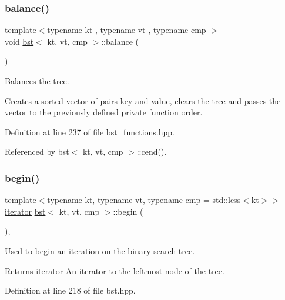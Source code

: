 \subsubsection{\texorpdfstring{balance()}{balance()}}
{\footnotesize\ttfamily template$<$typename kt , typename vt , typename cmp $>$ \\
void \hyperlink{classbst}{bst}$<$ kt, vt, cmp $>$\+::balance (\begin{DoxyParamCaption}{ }\end{DoxyParamCaption})\hspace{0.3cm}{\ttfamily [noexcept]}}



Balances the tree. 

Creates a sorted vector of pairs key and value, clears the tree and passes the vector to the previously defined private function order. 

Definition at line 237 of file bst\+\_\+functions.\+hpp.



Referenced by bst$<$ kt, vt, cmp $>$\+::cend().

\mbox{\label{classbst_a74c68495fd963c501084d129d4c0f5b1}} 
\subsubsection{\texorpdfstring{begin()}{begin()}\hspace{0.1cm}{\footnotesize\ttfamily [1/2]}}
{\footnotesize\ttfamily template$<$typename kt, typename vt, typename cmp = std\+::less$<$kt$>$$>$ \\
\hyperlink{classbst_a429b0445783ff6486882db5dee900ce0}{iterator} \hyperlink{classbst}{bst}$<$ kt, vt, cmp $>$\+::begin (\begin{DoxyParamCaption}{ }\end{DoxyParamCaption})\hspace{0.3cm}{\ttfamily [inline]}, {\ttfamily [noexcept]}}



Used to begin an iteration on the binary search tree. 

\begin{DoxyReturn}{Returns}
iterator An iterator to the leftmost node of the tree. 
\end{DoxyReturn}


Definition at line 218 of file bst.\+hpp.



